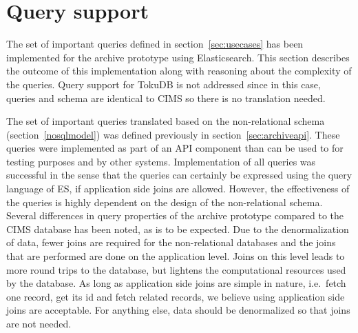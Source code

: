 
\section{Query support}

The set of important queries defined in section~\ref{sec:usecases} has been implemented for the archive prototype using Elasticsearch. This section describes the outcome of this implementation along with reasoning about the complexity of the queries. Query support for TokuDB is not addressed since in this case, queries and schema are identical to CIMS so there is no translation needed.

The set of important queries translated based on the non-relational schema (section~\ref{nosqlmodel}) was defined previously in section~\ref{sec:archiveapi}. These queries were implemented as part of an API component than can be used to for testing purposes and by other systems. Implementation of all queries was successful in the sense that the queries can certainly be expressed using the query language of ES, if application side joins are allowed. However, the effectiveness of the queries is highly dependent on the design of the non-relational schema. Several differences in query properties of the archive prototype compared to the CIMS database has been noted, as is to be expected. Due to the denormalization of data, fewer joins are required for the non-relational databases and the joins that are performed are done on the application level. Joins on this level leads to more round trips to the database, but lightens the computational resources used by the database. As long as application side joins are simple in nature, i.e.\ fetch one record, get its id and fetch related records, we believe using application side joins are acceptable. For anything else, data should be denormalized so that joins are not needed.



%

